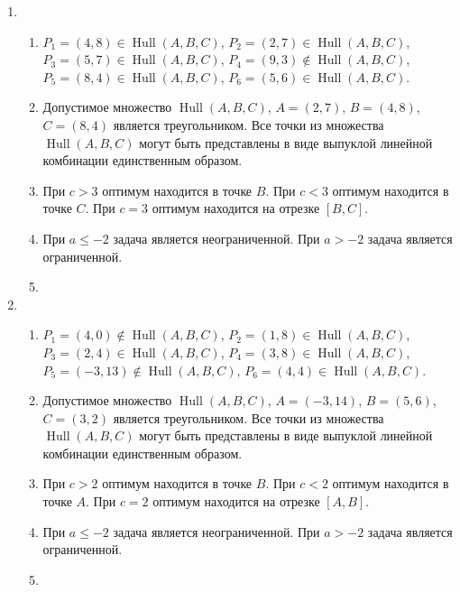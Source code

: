 \documentclass[12pt]{article}
\DeclareMathOperator{\Hull}{Hull}
\DeclareMathOperator{\hull}{\Hull}
\begin{document}
\begin{enumerate}
  \item %
  \begin{enumerate}
    \item $P_1 = (4, 8)  \in \hull(A, B, C)$, $P_2 = (2, 7)  \in \hull(A, B, C)$, 
    $P_3 = (5, 7) \in \hull(A, B, C)$, $P_4 = (9, 3) \notin \hull(A, B, C)$,
    $P_5 = (8, 4) \in \hull(A, B, C)$, $P_6 = (5, 6)  \in \hull(A, B, C)$. 
    \item Допустимое множество $\hull(A, B, C)$, $A = (2, 7)$, $B = (4, 8)$, $C = (8, 4)$  является треугольником. 
    Все точки из множества $\hull(A, B, C)$ могут быть представлены в виде выпуклой линейной комбинации единственным образом. 
    \item При $c > 3$ оптимум находится в точке $B$. 
    При $c < 3$ оптимум находится в точке $C$. 
    При $c = 3$ оптимум находится на отрезке $[B, C]$.
    \item При $a \leq -2$ задача является неограниченной. 
    При $a > -2$ задача является ограниченной. 
    \item 
  \end{enumerate}
  \item %
  \begin{enumerate}
    \item $P_1 = (4, 0) \notin \hull(A, B, C)$, $P_2 = (1, 8) \in \hull(A, B, C)$, 
    $P_3 = (2, 4) \in \hull(A, B, C)$, $P_4 = (3, 8) \in \hull(A, B, C)$,
    $P_5 = (-3, 13) \notin \hull(A, B, C)$, $P_6 = (4, 4)   \in \hull(A, B, C)$. 
    \item Допустимое множество $\hull(A, B, C)$, $A = (-3, 14)$, $B = (5, 6)$, $C = (3, 2)$ является треугольником. 
    Все точки из множества $\hull(A, B, C)$ могут быть представлены в виде выпуклой линейной комбинации единственным образом. 
    \item При $c > 2$ оптимум находится в точке $B$. 
    При $c < 2$ оптимум находится в точке $A$. 
    При $c = 2$ оптимум находится на отрезке $[A, B]$.
    \item При $a \leq -2$ задача является неограниченной. 
    При $a > -2$ задача является ограниченной. 
    \item 
  \end{enumerate}


\end{enumerate}
\end{document}
